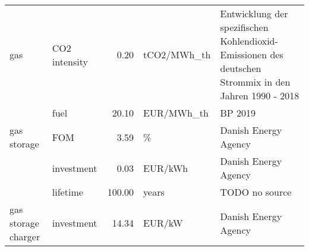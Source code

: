 \begin{longtable}{p{5cm}p{3cm}rp{3cm}p{11cm}}
gas & CO2 intensity &           0.20 &                       tCO2/MWh\_th &                                                                                                                                                                                                                                Entwicklung der spezifischen Kohlendioxid-Emissionen des deutschen Strommix in den Jahren 1990 - 2018 \\
                      & fuel &          20.10 &                        EUR/MWh\_th &                                                                                                                                                                                                                                                                                                                              BP 2019 \\
gas storage & FOM &           3.59 &                                 \% &                                                                                                                                                                                                                                                                                                                 Danish Energy Agency \\
                      & investment &           0.03 &                           EUR/kWh &                                                                                                                                                                                                                                                                                                                 Danish Energy Agency \\
                      & lifetime &         100.00 &                             years &                                                                                                                                                                                                                                                                                                                       TODO no source \\
gas storage charger & investment &          14.34 &                            EUR/kW &                                                                                                                                                                                                                                                                                                                 Danish Energy Agency \\

\end{longtable}
